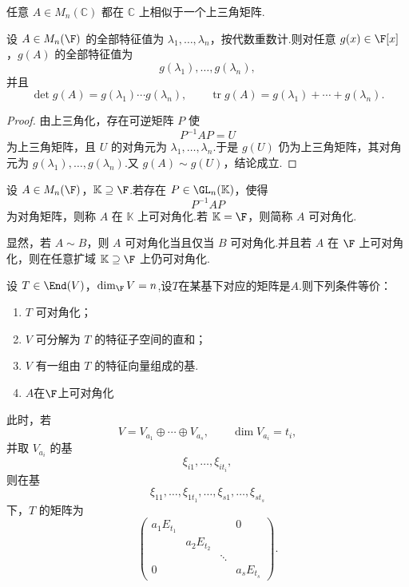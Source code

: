 \begin{corollary}\label{相似于一个上三角矩阵.}
	任意 $A\in M_n(\mathbb C)$ 都在 $\mathbb C$ 上相似于一个上三角矩阵.
\end{corollary}

\begin{corollary}
	设 $A\in M_n(\F)$ 的全部特征值为 $\lambda_1,\ldots,\lambda_n$，按代数重数计.则对任意 $g(x)\in\F[x]$，$g(A)$ 的全部特征值为
	\[
	g(\lambda_1),\ldots,g(\lambda_n),
	\]
	并且
	\[
	\det g(A)=g(\lambda_1)\cdots g(\lambda_n),
	\qquad
	\operatorname{tr} g(A)=g(\lambda_1)+\cdots+g(\lambda_n).
	\]
\end{corollary}

\begin{proof}
	由上三角化，存在可逆矩阵 $P$ 使
	\[
	P^{-1}AP=U
	\]
	为上三角矩阵，且 $U$ 的对角元为 $\lambda_1,\ldots,\lambda_n$.于是 $g(U)$ 仍为上三角矩阵，其对角元为 $g(\lambda_1),\ldots,g(\lambda_n)$.又 $g(A)\sim g(U)$，结论成立.
\end{proof}

\begin{definition}\label{p1:concept:c5-l1191}
	设 $A\in M_n(\F)$，$\mathbb K\supseteq\F$.若存在 $P\in \GL_n(\mathbb K)$，使得
	\[
	P^{-1}AP
	\]
	为对角矩阵，则称 $A$ 在 $\mathbb K$ 上可对角化.若 $\mathbb K=\F$，则简称 $A$ 可对角化.
\end{definition}

显然，若 $A\sim B$，则 $A$ 可对角化当且仅当 $B$ 可对角化.并且若 $A$ 在 $\F$ 上可对角化，则在任意扩域 $\mathbb K\supseteq\F$ 上仍可对角化.


	设 $T\in\End(V)$，$\dim_{\F}V=n$,设$T$在某基下对应的矩阵是$A$.则下列条件等价：
	\begin{enumerate}
		\item $T$ 可对角化；
		\item $V$ 可分解为 $T$ 的特征子空间的直和；
		\item $V$ 有一组由 $T$ 的特征向量组成的基.
		\item $A$在$\F$上可对角化
	\end{enumerate}
	此时，若
	\[
	V=V_{a_1}\oplus\cdots\oplus V_{a_s},
	\qquad \dim V_{a_i}=t_i,
	\]
	并取 $V_{a_i}$ 的基
	\[
	\xi_{i1},\ldots,\xi_{it_i},
	\]
	则在基
	\[
	\xi_{11},\ldots,\xi_{1t_1},\ldots,
	\xi_{s1},\ldots,\xi_{st_s}
	\]
	下，$T$ 的矩阵为
	\[
	\begin{pmatrix}
		a_1E_{t_1}&&&0\\
		&a_2E_{t_2}&&\\
		&&\ddots&\\
		0&&&a_sE_{t_s}
	\end{pmatrix}.
	\]

